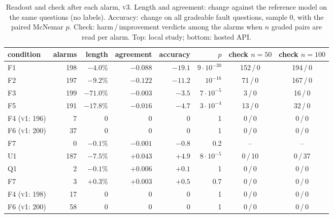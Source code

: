 \documentclass{article}
\newcommand{\vone}{\textsc{v1}}
\newcommand{\vthree}{\textsc{v3}}
\begin{document}
\begin{table}[h]
  \centering\small
  \caption{Readout and check after each alarm, \vthree{}. Length and agreement:
  change against the reference model on the same questions (no labels). Accuracy:
  change on all gradeable fault questions, sample 0, with the paired McNemar $p$.
  Check: harm\,/\,improvement verdicts among the alarms when $n$ graded pairs are
  read per alarm. Top: local study; bottom: hosted API.}
  \label{tab:triage}
  \begin{tabular}{lrrrrrcc}
    \toprule
    condition & alarms & length & agreement & accuracy & $p$ & check $n{=}50$ & check $n{=}100$ \\
    \midrule
    F1 & 198 & $-4.0\%$ & $-0.088$ & $-19.1$ & $9\cdot10^{-30}$ & 152\,/\,0 & 194\,/\,0 \\
    F2 & 197 & $-9.2\%$ & $-0.122$ & $-11.2$ & $10^{-16}$ & 71\,/\,0 & 167\,/\,0 \\
    F3 & 199 & $-71.0\%$ & $-0.003$ & $-3.5$ & $7\cdot10^{-5}$ & 3\,/\,0 & 16\,/\,0 \\
    F5 & 191 & $-17.8\%$ & $-0.016$ & $-4.7$ & $3\cdot10^{-4}$ & 13\,/\,0 & 32\,/\,0 \\
    F4 (\vone{}: 196) & 7 & $0$ & $0$ & $0$ & 1 & 0\,/\,0 & 0\,/\,0 \\
    F6 (\vone{}: 200) & 37 & $0$ & $0$ & $0$ & 1 & 0\,/\,0 & 0\,/\,0 \\
    F7 & 0 & $-0.1\%$ & $-0.001$ & $-0.8$ & 0.2 & -- & -- \\
    \midrule
    U1 & 187 & $-7.5\%$ & $+0.043$ & $+4.9$ & $8\cdot10^{-5}$ & 0\,/\,10 & 0\,/\,37 \\
    Q1 & 2 & $-0.1\%$ & $+0.006$ & $+0.1$ & 1 & 0\,/\,0 & 0\,/\,0 \\
    F7 & 3 & $+0.3\%$ & $+0.003$ & $+0.5$ & 0.7 & 0\,/\,0 & 0\,/\,0 \\
    F4 (\vone{}: 198) & 17 & $0$ & $0$ & $0$ & 1 & 0\,/\,0 & 0\,/\,0 \\
    F6 (\vone{}: 200) & 58 & $0$ & $0$ & $0$ & 1 & 0\,/\,0 & 0\,/\,0 \\
    \bottomrule
  \end{tabular}
\end{table}
\end{document}

